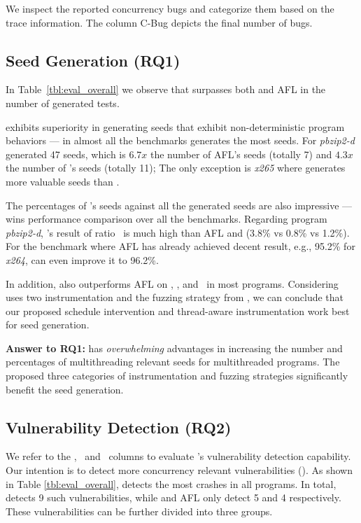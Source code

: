 We inspect the reported concurrency bugs and categorize them based on the trace information. The 
column \textsf{C-Bug} depicts the final number of bugs. 

\subsection{Seed Generation (RQ1)}
In Table~\ref{tbl:eval_overall} we observe that \mtfuzz surpasses both \mtfuzzc and AFL in the 
number of generated tests. 

\mtfuzz exhibits superiority in generating seeds that exhibit non-deterministic 
program behaviors --- in almost all the benchmarks \mtfuzz generates the most seeds. 
For \emph{pbzip2-d} \mtfuzz generated 47 seeds, which is $6.7x$ the number of AFL's seeds 
(totally 7) and $4.3x$ the number of \mtfuzzc's seeds (totally 11); The only exception is \emph{x265} 
where \mtfuzzc generates more valuable seeds than \mtfuzz.

The percentages of \mtfuzz's seeds against all the generated seeds are also impressive 
--- \mtfuzz wins performance comparison over all the benchmarks. Regarding program \emph{pbzip2-d}, 
\mtfuzz's result of ratio \testsRatio~is much high than AFL and \mtfuzzc (3.8\% vs 0.8\% vs 1.2\%). 
For the benchmark where AFL has already achieved decent result, e.g., 95.2\% for \emph{x264}, \mtfuzz 
can even improve it to 96.2\%. 

In addition, \mtfuzzc also outperforms AFL on \testsALL, \testsMT, and \testsRatio~in most programs. 
Considering \mtfuzzc uses two instrumentation and the fuzzing strategy from \mtfuzz, we can conclude 
that our proposed schedule intervention and thread-aware instrumentation work best for seed generation.






\begin{tcolorbox}[size=title]
{ \textbf{Answer to RQ1: } \mtfuzz has \emph{overwhelming} advantages in increasing the number and 
percentages of multithreading relevant seeds for multithreaded programs. The proposed three categories of instrumentation and fuzzing strategies significantly benefit the seed generation.}
\end{tcolorbox}



\subsection{Vulnerability Detection (RQ2)}
We refer to the \vulsNUM, \vulsMT~and \vulsST~columns to evaluate \mtfuzz's vulnerability
detection capability. Our intention is to detect more concurrency relevant vulnerabilities 
(\vulsMT). As shown in Table \ref{tbl:eval_overall}, \mtfuzz detects the most 
crashes in all programs. In total, \mtfuzz detects 9 such vulnerabilities, while \mtfuzzc and AFL only detect 5 and 4 respectively.
These vulnerabilities can be further divided into three groups.

